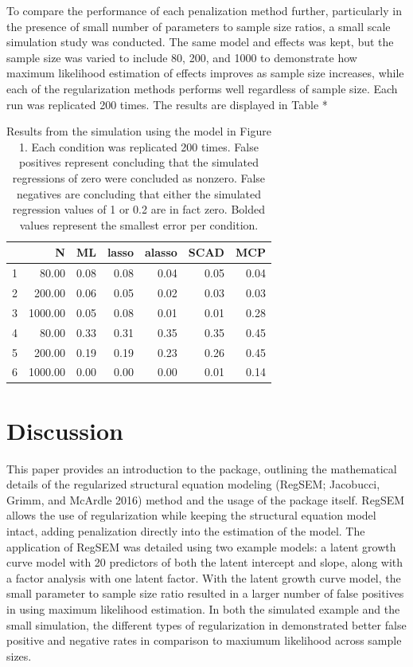 \documentclass[article]{jss}
\begin{document}
To compare the performance of each penalization method further,
particularly in the presence of small number of parameters to sample
size ratios, a small scale simulation study was conducted. The same
model and effects was kept, but the sample size was varied to include
80, 200, and 1000 to demonstrate how maximum likelihood estimation of
effects improves as sample size increases, while each of the
regularization methods performs well regardless of sample size. Each run
was replicated 200 times. The results are displayed in Table *

\begin{table}[ht]
\centering
\begin{tabular}{rrrrrrr}
  \hline
 & N & ML & lasso & alasso & SCAD & MCP \\ 
  \hline
1 & 80.00 & 0.08 & 0.08 & 0.04 & 0.05 & 0.04 \\ 
  2 & 200.00 & 0.06 & 0.05 & 0.02 & 0.03 & 0.03 \\ 
  3 & 1000.00 & 0.05 & 0.08 & 0.01 & 0.01 & 0.28 \\ 
  4 & 80.00 & 0.33 & 0.31 & 0.35 & 0.35 & 0.45 \\ 
  5 & 200.00 & 0.19 & 0.19 & 0.23 & 0.26 & 0.45 \\ 
  6 & 1000.00 & 0.00 & 0.00 & 0.00 & 0.01 & 0.14 \\ 
   \hline
\end{tabular}
    \caption{Results from the simulation using the model in Figure 1. Each condition was replicated 200 times. False positives represent concluding that the simulated regressions of zero were concluded as nonzero. False negatives are concluding that either the simulated regression values of 1 or 0.2 are in fact zero. Bolded values represent the smallest error per condition.}
\end{table}

\section{Discussion}\label{discussion}

This paper provides an introduction to the  package,
outlining the mathematical details of the regularized structural
equation modeling (RegSEM; Jacobucci, Grimm, and McArdle 2016) method
and the usage of the package itself. RegSEM allows the use of
regularization while keeping the structural equation model intact,
adding penalization directly into the estimation of the model. The
application of RegSEM was detailed using two example models: a latent
growth curve model with 20 predictors of both the latent intercept and
slope, along with a factor analysis with one latent factor. With the
latent growth curve model, the small parameter to sample size ratio
resulted in a larger number of false positives in using maximum
likelihood estimation. In both the simulated example and the small
simulation, the different types of regularization in 
demonstrated better false positive and negative rates in comparison to
maxiumum likelihood across sample sizes.
\end{document}
